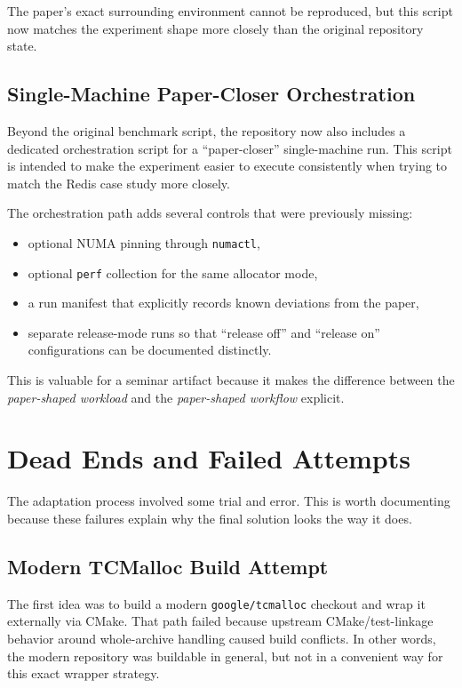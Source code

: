\documentclass[a4paper,11pt]{article}
\begin{document}
The paper's exact surrounding environment cannot be reproduced, but this script now matches the experiment shape more closely than the original repository state.

\subsection{Single-Machine Paper-Closer Orchestration}

Beyond the original benchmark script, the repository now also includes a
dedicated orchestration script for a ``paper-closer'' single-machine run. This
script is intended to make the experiment easier to execute consistently when
trying to match the Redis case study more closely.

The orchestration path adds several controls that were previously missing:

\begin{itemize}[leftmargin=1.5em]
  \item optional NUMA pinning through \texttt{numactl},
  \item optional \texttt{perf} collection for the same allocator mode,
  \item a run manifest that explicitly records known deviations from the paper,
  \item separate release-mode runs so that ``release off'' and ``release on''
  configurations can be documented distinctly.
\end{itemize}

This is valuable for a seminar artifact because it makes the difference between
the \emph{paper-shaped workload} and the \emph{paper-shaped workflow} explicit.

\section{Dead Ends and Failed Attempts}

The adaptation process involved some trial and error.
This is worth documenting because these failures explain why the final solution looks the way it does.

\subsection{Modern TCMalloc Build Attempt}

The first idea was to build a modern \texttt{google/tcmalloc} checkout and wrap it externally via CMake.
That path failed because upstream CMake/test-linkage behavior around whole-archive handling caused build conflicts.
In other words, the modern repository was buildable in general, but not in a convenient way for this exact wrapper strategy.
\end{document}

